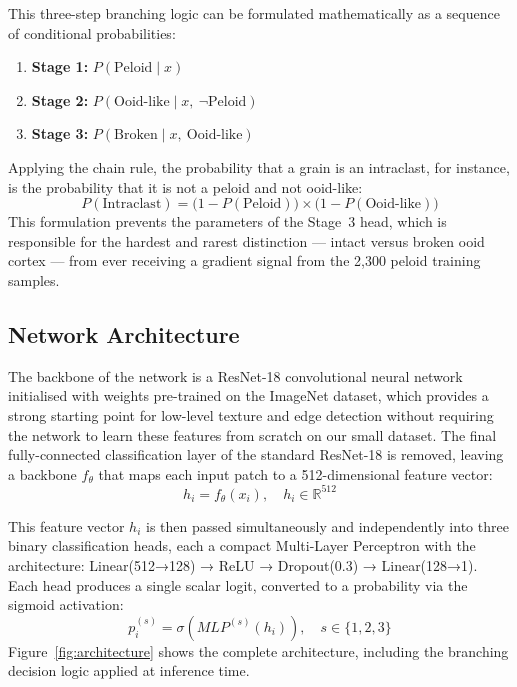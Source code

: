 \documentclass[a4paper,fleqn]{cas-dc}
\begin{document}
This three-step branching logic can be formulated mathematically as a sequence of conditional probabilities:
\begin{enumerate}
  \item \textbf{Stage 1:} $P(\text{Peloid} \mid x)$
  \item \textbf{Stage 2:} $P(\text{Ooid-like} \mid x,\ \neg\text{Peloid})$
  \item \textbf{Stage 3:} $P(\text{Broken} \mid x,\ \text{Ooid-like})$
\end{enumerate}
Applying the chain rule, the probability that a grain is an intraclast, for instance, is the probability that it is not a peloid and not ooid-like:
\begin{equation}
P(\text{Intraclast}) = \bigl(1 - P(\text{Peloid})\bigr) \times \bigl(1 - P(\text{Ooid-like})\bigr)
\end{equation}
This formulation prevents the parameters of the Stage~3 head, which is responsible for the hardest and rarest distinction --- intact versus broken ooid cortex --- from ever receiving a gradient signal from the 2,300 peloid training samples.

\subsection{Network Architecture}
The backbone of the network is a ResNet-18 convolutional neural network initialised with weights pre-trained on the ImageNet dataset, which provides a strong starting point for low-level texture and edge detection without requiring the network to learn these features from scratch on our small dataset. The final fully-connected classification layer of the standard ResNet-18 is removed, leaving a backbone $f_\theta$ that maps each input patch to a 512-dimensional feature vector:
\begin{equation}
h_i = f_\theta(x_i), \quad h_i \in \mathbb{R}^{512}
\end{equation}

This feature vector $h_i$ is then passed simultaneously and independently into three binary classification heads, each a compact Multi-Layer Perceptron with the architecture: Linear(512→128) → ReLU → Dropout(0.3) → Linear(128→1). Each head produces a single scalar logit, converted to a probability via the sigmoid activation:
\begin{equation}
p_i^{(s)} = \sigma\!\left(MLP^{(s)}(h_i)\right), \quad s \in \{1,2,3\}
\end{equation}
Figure~\ref{fig:architecture} shows the complete architecture, including the branching decision logic applied at inference time.
\end{document}
